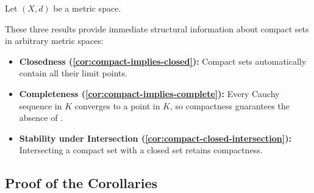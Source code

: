 \begin{content}
Let $(X, d)$ be a metric space.




\begin{steps}
These three results provide immediate structural information about compact sets in arbitrary metric spaces:
\begin{itemize}
    \item \textbf{Closedness (\cref{cor:compact-implies-closed}):} Compact sets automatically contain all their limit points.
    \item \textbf{Completeness (\cref{cor:compact-implies-complete}):} Every Cauchy sequence in $K$ converges to a point in $K$, so compactness guarantees the absence of .
    \item \textbf{Stability under Intersection (\cref{cor:compact-closed-intersection}):} Intersecting a compact set with a closed set retains compactness.
\end{itemize}
\end{steps}
\end{content}

\subsection{Proof of the Corollaries}

